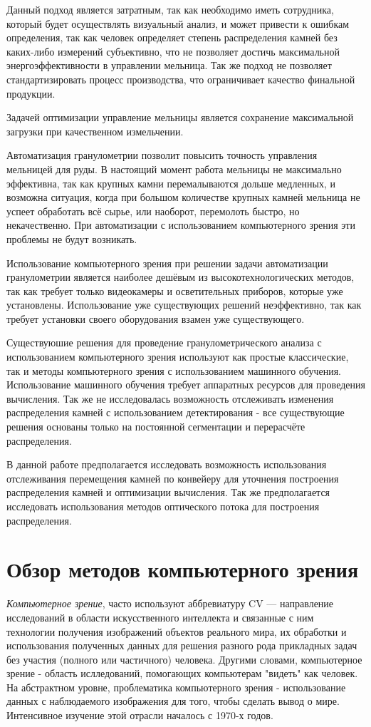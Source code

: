 \documentclass[times]{itmo-student-thesis}
\begin{document}
Данный подход является затратным, так как необходимо иметь сотрудника, который будет осуществлять визуальный анализ, и может привести к ошибкам определения, так как человек определяет степень распределения камней без каких-либо измерений субъективно, что не позволяет достичь максимальной энергоэффективности в управлении мельница. Так же подход не позволяет стандартизировать процесс производства, что ограничивает качество финальной продукции.

Задачей оптимизации управление мельницы является сохранение максимальной загрузки при качественном измельчении. 

Автоматизация гранулометрии позволит повысить точность управления мельницей для руды. В настоящий момент работа мельницы не максимально эффективна, так как крупных камни перемалываются дольше медленных, и возможна ситуация, когда при большом количестве крупных камней мельница не успеет обработать всё сырье, или наоборот, перемолоть быстро, но некачественно. При автоматизации с использованием компьютерного зрения эти проблемы не будут возникать. 

Использование компьютерного зрения при решении задачи автоматизации гранулометрии является наиболее дешёвым из высокотехнологических методов, так как требует только видеокамеры и осветительных приборов, которые уже установлены. Использование уже существующих решений неэффективно, так как требует установки своего оборудования взамен уже существующего.


Существуюшие решения для проведение гранулометрического анализа с использованием компьютерного зрения используют  как простые классические, так и методы компьютерного зрения с использованием машинного обучения. Использование машинного обучения требует  аппаратных ресурсов для проведения вычисления. Так же не исследовалась возможность отслеживать изменения распределения камней с использованием детектирования - все существующие решения основаны только на постоянной сегментации и перерасчёте распределения.

В данной работе предполагается исследовать возможность использования отслеживания перемещения камней по конвейеру для уточнения построения распределения камней и оптимизации вычисления. Так же предполагается исследовать использования методов оптического потока для построения распределения.


\section{Обзор методов компьютерного зрения}
\textit{Компьютерное зрение}, часто используют аббревиатуру CV — направление исследований в области искусственного интеллекта и связанные с ним технологии получения изображений объектов реального мира, их обработки и использования полученных данных для решения разного рода прикладных задач без участия (полного или частичного) человека. Другими словами, компьютерное зрение - область ислледований, помогающих компьютерам "видеть" как человек. На абстрактном уровне, проблематика компьютерного зрения - использование данных с наблюдаемого изображения для того, чтобы сделать вывод о мире. Интенсивное изучение этой отрасли началось с 1970-х годов.
\end{document}
